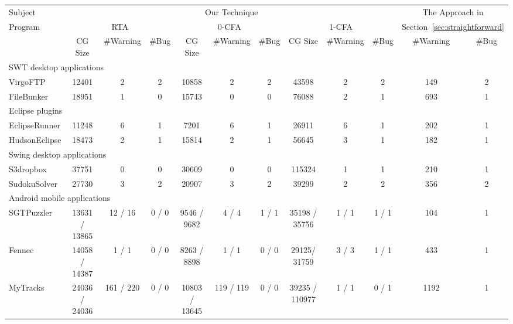 \begin{table*}[ht]
\begin{center}
 \fontsize{9pt}{\baselineskip}\selectfont
\hspace*{-0.2cm}
\setlength{\tabcolsep}{.35\tabcolsep}
\begin{tabular}{|l||c|c|c||c|c|c||c|c|c||c|c|}
\hline
 Subject&  \multicolumn{9}{|c||}{Our Technique} & \multicolumn{2}{|c|}{The Approach in}  \\
\cline{2-10}
 Program  &  \multicolumn{3}{|c|}{RTA }& \multicolumn{3}{|c|}{0-CFA } & \multicolumn{3}{|c||}{1-CFA } & \multicolumn{2}{|c|}{Section~\ref{sec:straightforward}}  \\
\cline{2-12}
 & CG Size & \#Warning & \#Bug & CG Size & \#Warning & \#Bug & CG Size & \#Warning & \#Bug & \#Warning & \#Bug\\
\hline \hline
\multicolumn{12}{|l|}{SWT desktop applications}   \\
 \hline
 VirgoFTP&  12401 &  2 &  2 & 10858 & 2 & 2 & 43598 & 2 & 2& 149 & 2 \\
 \hline
 FileBunker &  18951 &  1 &  0 & 15743 & 0 & 0 & 76088 & 2 & 1& 693 & 1 \\
 \hline
 \hline
\multicolumn{12}{|l|}{Eclipse plugins}   \\
 \hline
 EclipseRunner&  11248&  6 &  1 & 7201 & 6 & 1 & 26911 & 6 & 1& 202 & 1 \\
 \hline
 HudsonEclipse& 18473 &  2 &  1 & 15814 & 2 & 1& 56645 & 3 & 1 & 182 & 1 \\
 \hline
 \hline
\multicolumn{12}{|l|}{Swing desktop applications}   \\
 \hline
 S3dropbox & 37751 &  0 &  0 & 30609 & 0 & 0 & 115324 & 1 & 1 & 210 & 1 \\
 \hline
  SudokuSolver&  27730&  3 &  2 & 20907 & 3 & 2 & 39299 & 2 & 2 & 356 & 2 \\
 \hline
 \hline
\multicolumn{12}{|l|}{Android mobile applications}   \\
 \hline
 SGTPuzzler & 13631 / 13865&  12 / 16 &  0 / 0 & 9546 / 9682& 4 / 4& 1 / 1 & 35198 / 35756 & 1 / 1  & 1 / 1& 104 & 1 \\
 \hline
 Fennec & 14058 / 14387 &  1 / 1 &  0 / 0 & 8263 / 8898 & 1 / 1 & 0 / 0& 29125/ 31759 & 3 / 3 & 1 / 1& 433 & 1 \\
 \hline
 MyTracks & 24036 / 24036 &  161 / 220 & 0 / 0 & 10803 / 13645 & 119 / 119 & 0 / 0 & 39235 / 110977 & 1 / 1 & 0 / 1 & 1192 & 1 \\

\end{tabular}
\end{center}
\end{table*}
